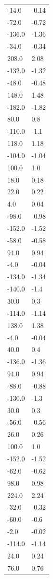 \begin{longtable}{ll}
-14.0 & -0.14 \\
-72.0 & -0.72 \\
-136.0 & -1.36 \\
-34.0 & -0.34 \\
208.0 & 2.08 \\
-132.0 & -1.32 \\
-48.0 & -0.48 \\
148.0 & 1.48 \\
-182.0 & -1.82 \\
80.0 & 0.8 \\
-110.0 & -1.1 \\
118.0 & 1.18 \\
-104.0 & -1.04 \\
100.0 & 1.0 \\
18.0 & 0.18 \\
22.0 & 0.22 \\
4.0 & 0.04 \\
-98.0 & -0.98 \\
-152.0 & -1.52 \\
-58.0 & -0.58 \\
94.0 & 0.94 \\
-4.0 & -0.04 \\
-134.0 & -1.34 \\
-140.0 & -1.4 \\
30.0 & 0.3 \\
-114.0 & -1.14 \\
138.0 & 1.38 \\
-4.0 & -0.04 \\
40.0 & 0.4 \\
-136.0 & -1.36 \\
94.0 & 0.94 \\
-88.0 & -0.88 \\
-130.0 & -1.3 \\
30.0 & 0.3 \\
-56.0 & -0.56 \\
26.0 & 0.26 \\
100.0 & 1.0 \\
-152.0 & -1.52 \\
-62.0 & -0.62 \\
98.0 & 0.98 \\
224.0 & 2.24 \\
-32.0 & -0.32 \\
-60.0 & -0.6 \\
-2.0 & -0.02 \\
-114.0 & -1.14 \\
24.0 & 0.24 \\
76.0 & 0.76 \\

\end{longtable}

